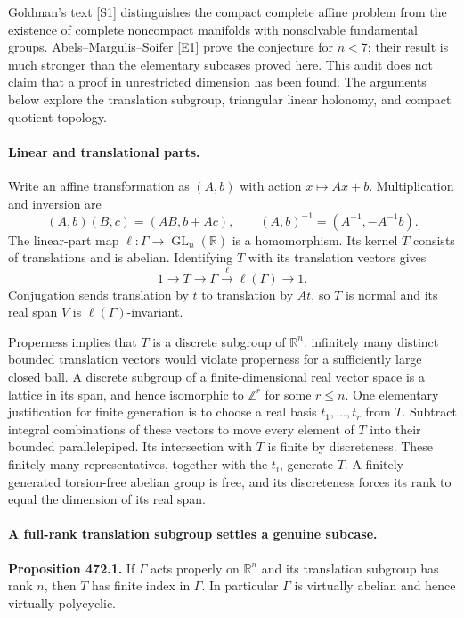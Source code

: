 \documentclass[11pt]{article}
\begin{document}
Goldman's text [S1] distinguishes the compact complete affine problem
from the existence of complete noncompact manifolds with nonsolvable
fundamental groups. Abels--Margulis--Soifer [E1] prove the conjecture
for $n<7$; their result is much stronger than the elementary subcases
proved here. This audit does not claim that a proof in unrestricted
dimension has been found. The arguments below explore the translation
subgroup, triangular linear holonomy, and compact quotient topology.

\paragraph{Linear and translational parts.}
Write an affine transformation as $(A,b)$ with action $x\mapsto Ax+b$.
Multiplication and inversion are
\[
 (A,b)(B,c)=(AB,b+Ac),\qquad
 (A,b)^{-1}=(A^{-1},-A^{-1}b).
\]
The linear-part map $\ell:\Gamma\to\operatorname{GL}_n(\mathbb R)$
is a homomorphism. Its kernel $T$ consists of translations and is
abelian. Identifying $T$ with its translation vectors gives
\[
 1\longrightarrow T\longrightarrow\Gamma
 \stackrel{\ell}{\longrightarrow}\ell(\Gamma)\longrightarrow1.
\]
Conjugation sends translation by $t$ to translation by $At$, so $T$
is normal and its real span $V$ is $\ell(\Gamma)$-invariant.

Properness implies that $T$ is a discrete subgroup of $\mathbb R^n$:
infinitely many distinct bounded translation vectors would violate
properness for a sufficiently large closed ball. A discrete subgroup
of a finite-dimensional real vector space is a lattice in its span,
and hence isomorphic to $\mathbb Z^r$ for some $r\leq n$.
One elementary justification for finite generation is to choose a real
basis $t_1,\ldots,t_r$ from $T$. Subtract integral combinations of
these vectors to move every element of $T$ into their bounded
parallelepiped. Its intersection with $T$ is finite by discreteness.
These finitely many representatives, together with the $t_i$, generate
$T$. A finitely generated torsion-free abelian group is free, and its
discreteness forces its rank to equal the dimension of its real span.

\paragraph{A full-rank translation subgroup settles a genuine subcase.}
\textbf{Proposition 472.1.} If $\Gamma$ acts properly on $\mathbb R^n$
and its translation subgroup has rank $n$, then $T$ has finite index
in $\Gamma$. In particular $\Gamma$ is virtually abelian and hence
virtually polycyclic.
\end{document}

